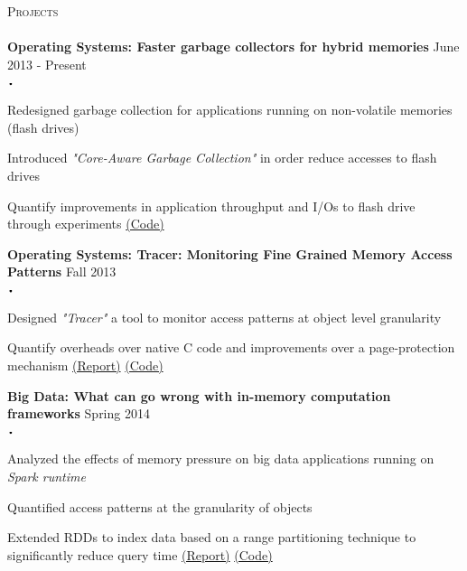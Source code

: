 \documentclass{article}
\newcommand{\sbt}{\,\begin{picture}(-1,1)(-1,-3)\circle*{2}\end{picture}\ }
\newcommand{\lineunder}{\vspace*{-8pt} \\ \hspace*{-18pt} \hrulefill \\}
\newcommand{\header}[1]{{\hspace*{-15pt}\vspace*{6pt} \textsc{#1}} \vspace*{-6pt} \lineunder}
\newcommand{\project}[2]{{ \textbf{#1} \hfill #2\\  }}
\newenvironment{achievements}{\begin{list}{$\sbt$}{\topsep -2pt \itemsep -2pt}}{\vspace*{0pt}\end{list}}
\begin{document}
\header{Projects}
\project{Operating Systems: Faster garbage collectors for hybrid memories}{June 2013 - Present}
	\begin{achievements}
		\item Redesigned garbage collection for applications running on non-volatile memories (flash drives)
		\item Introduced \textit{"Core-Aware Garbage Collection"} in order reduce accesses to flash drives
		\item Quantify improvements in application throughput and I/Os to flash drive through experiments \newline 
		\href{https://github.com/PrincetonUniversity/NVJVM}{(Code)}
		
	\end{achievements}
\vspace{3mm}
\project{Operating Systems: Tracer: Monitoring Fine Grained Memory Access Patterns}{Fall 2013}
	\begin{achievements}
		\item Designed \textit{"Tracer"} a tool to monitor access patterns at object level granularity
		\item Quantify overheads over native C code and improvements over a page-protection mechanism \newline
		 \href{https://drive.google.com/file/d/0B6dV4oJpL8T8czdNNGhLSWhFQWM/view?usp=sharing}{(Report)}
		 \href{https://github.com/ravifreek63/memory_manager}{(Code)}
		
	\end{achievements}
\vspace{3mm}	
\project{Big Data: What can go wrong with in-memory computation frameworks}{Spring 2014}
	\begin{achievements}
		\item Analyzed the effects of memory pressure on big data applications running on \textit{Spark runtime}
		\item Quantified access patterns at the granularity of objects
		\item Extended RDDs to index data based on a range partitioning technique to significantly reduce query time \newline
		 \href{https://drive.google.com/file/d/0B6dV4oJpL8T8SHdCUF9aSGdPNU0/view?usp=sharing}{(Report)}
		 \href{https://github.com/ravifreek63/memoSpark}{(Code)}		 
	\end{achievements}
\vspace{3mm}	
\end{document}
